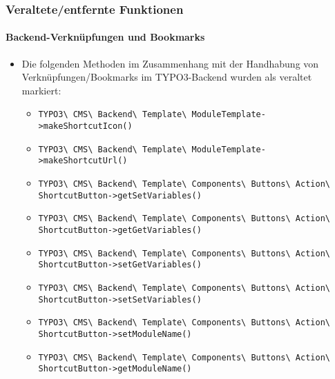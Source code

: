 %

\begin{frame}[fragile]
	\frametitle{Veraltete/entfernte Funktionen}
	\framesubtitle{Backend-Verknüpfungen und Bookmarks}

	\begin{itemize}
		\item Die folgenden Methoden im Zusammenhang mit der Handhabung von Verknüpfungen/Bookmarks
			im TYPO3-Backend wurden als veraltet markiert:
			\vspace{0.2cm}
			\begin{itemize}\tiny
				\item \texttt{TYPO3\textbackslash
					CMS\textbackslash
					Backend\textbackslash
					Template\textbackslash
					ModuleTemplate->makeShortcutIcon()}
				\item \texttt{TYPO3\textbackslash
					CMS\textbackslash
					Backend\textbackslash
					Template\textbackslash
					ModuleTemplate->makeShortcutUrl()}
				\item \texttt{TYPO3\textbackslash
					CMS\textbackslash
					Backend\textbackslash
					Template\textbackslash
					Components\textbackslash
					Buttons\textbackslash
					Action\textbackslash
					ShortcutButton->getSetVariables()}
				\item \texttt{TYPO3\textbackslash
					CMS\textbackslash
					Backend\textbackslash
					Template\textbackslash
					Components\textbackslash
					Buttons\textbackslash
					Action\textbackslash
					ShortcutButton->getGetVariables()}
				\item \texttt{TYPO3\textbackslash
					CMS\textbackslash
					Backend\textbackslash
					Template\textbackslash
					Components\textbackslash
					Buttons\textbackslash
					Action\textbackslash
					ShortcutButton->setGetVariables()}
				\item \texttt{TYPO3\textbackslash
					CMS\textbackslash
					Backend\textbackslash
					Template\textbackslash
					Components\textbackslash
					Buttons\textbackslash
					Action\textbackslash
					ShortcutButton->setSetVariables()}
				\item \texttt{TYPO3\textbackslash
					CMS\textbackslash
					Backend\textbackslash
					Template\textbackslash
					Components\textbackslash
					Buttons\textbackslash
					Action\textbackslash
					ShortcutButton->setModuleName()}
				\item \texttt{TYPO3\textbackslash
					CMS\textbackslash
					Backend\textbackslash
					Template\textbackslash
					Components\textbackslash
					Buttons\textbackslash
					Action\textbackslash
					ShortcutButton->getModuleName()}
			\end{itemize}\normalsize


\end{itemize}
\end{frame}
